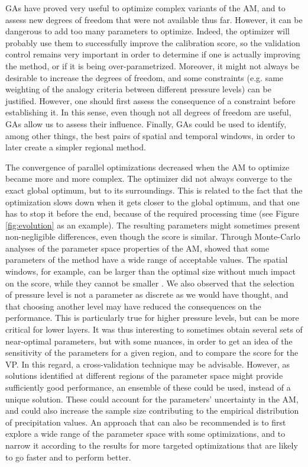 \documentclass[review]{elsarticle}
\begin{document}
GAs have proved very useful to optimize complex variants of the AM, and to assess new degrees of freedom that were not available thus far. However, it can be dangerous to add too many parameters to optimize. Indeed, the optimizer will probably use them to successfully improve the calibration score, so the validation control remains very important in order to determine if one is actually improving the method, or if it is being over-parametrized. Moreover, it might not always be desirable to increase the degrees of freedom, and some constraints (e.g. same weighting of the analogy criteria between different pressure levels) can be justified. However, one should first assess the consequence of a constraint before establishing it. In this sense, even though not all degrees of freedom are useful, GAs allow us to assess their influence. Finally, GAs could be used to identify, among other things, the best pairs of spatial and temporal windows, in order to later create a simpler regional method.

The convergence of parallel optimizations decreased when the AM to optimize became more and more complex. The optimizer did not always converge to the exact global optimum, but to its surroundings. This is related to the fact that the optimization slows down when it gets closer to the global optimum, and that one has to stop it before the end, because of the required processing time (see Figure \ref{fig:evolution} as an example). The resulting parameters might sometimes present non-negligible differences, even though the score is similar. Through Monte-Carlo analyses of the parameter space properties of the AM, \citet{Horton2012a} showed that some parameters of the method have a wide range of acceptable values. The spatial windows, for example, can be larger than the optimal size without much impact on the score, while they cannot be smaller \citep[see also][]{Bontron2004}. We also observed that the selection of pressure level is not a parameter as discrete as we would have thought, and that choosing another level may have reduced the consequences on the performance. This is particularly true for higher pressure levels, but can be more critical for lower layers. It was thus interesting to sometimes obtain several sets of near-optimal parameters, but with some nuances, in order to get an idea of the sensitivity of the parameters for a given region, and to compare the score for the VP. In this regard, a cross-validation technique may be advisable. However, as solutions identified at different regions of the parameter space might provide sufficiently good performance, an ensemble of these could be used, instead of a unique solution. These could account for the parameters’ uncertainty in the AM, and could also increase the sample size contributing to the empirical distribution of precipitation values. An approach that can also be recommended is to first explore a wide range of the parameter space with some optimizations, and to narrow it according to the results for more targeted optimizations that are likely to go faster and to perform better.
\end{document}
